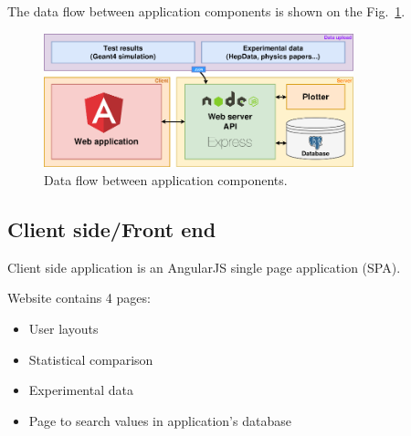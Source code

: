 
The data flow between application components is shown on the Fig.~\ref{fig:dataflow}.

\begin{figure}[h]
    \centering
    \includegraphics[width=0.8\textwidth,clip]{schema.png}
    \caption{Data flow between application components.}
    \label{fig:dataflow}
\end{figure}

\subsection{Client side/Front end}
\label{sec-webapplication-client}

Client side application is an AngularJS single page application (SPA). 


Website contains 4 pages:

\begin{itemize}
    \item User layouts
    \item Statistical comparison
    \item Experimental data
    \item Page to search values in application's database
\end{itemize}

